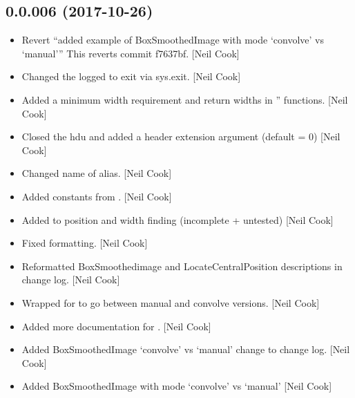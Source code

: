 \documentclass[a4paper,10pt,english]{report}
\begin{document}
\subsection{0.0.006 (2017-10-26)}
\label{\detokenize{misc/changelog:id544}}\begin{itemize}
\item {} 
Revert “added example of BoxSmoothedImage with mode ‘convolve’ vs
‘manual’” This reverts commit f7637bf. {[}Neil Cook{]}

\item {} 
Changed the logged to exit via sys.exit. {[}Neil Cook{]}

\item {} 
Added a minimum width requirement and return widths in
” functions. {[}Neil Cook{]}

\item {} 
Closed the hdu and added a header extension argument (default = 0)
{[}Neil Cook{]}

\item {} 
Changed name of  alias. {[}Neil Cook{]}

\item {} 
Added constants from . {[}Neil Cook{]}

\item {} 
Added to position and width finding (incomplete + untested) {[}Neil
Cook{]}

\item {} 
Fixed formatting. {[}Neil Cook{]}

\item {} 
Reformatted BoxSmoothedimage and LocateCentralPosition descriptions in
change log. {[}Neil Cook{]}

\item {} 
Wrapped for  to go between manual and convolve
versions. {[}Neil Cook{]}

\item {} 
Added more documentation for . {[}Neil Cook{]}

\item {} 
Added BoxSmoothedImage ‘convolve’ vs ‘manual’ change to change log.
{[}Neil Cook{]}

\item {} 
Added BoxSmoothedImage with mode ‘convolve’ vs ‘manual’ {[}Neil Cook{]}

\end{itemize}
\end{document}
